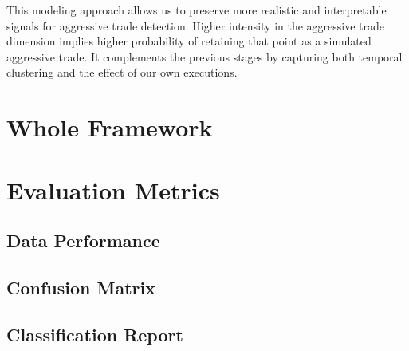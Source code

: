 This modeling approach allows us to preserve more realistic and interpretable signals for aggressive trade detection. Higher intensity in the aggressive trade dimension implies higher probability of retaining that point as a simulated aggressive trade. It complements the previous stages by capturing both temporal clustering and the effect of our own executions.


\section{Whole Framework}


\section{Evaluation Metrics}

\subsection{Data Performance}

\subsection{Confusion Matrix}

\subsection{Classification Report}







